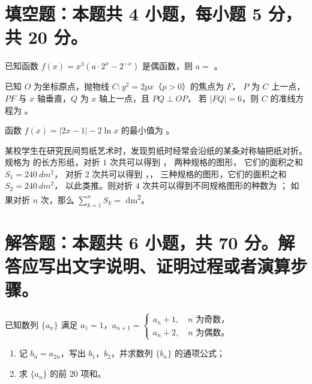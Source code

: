 \documentclass{exam-zh}
\begin{document}
\section{填空题：本题共 4 小题，每小题 5 分，共 20 分。}

\begin{question}
  已知函数 $f(x) = x^3 (a \cdot 2^x - 2^{-x})$ 是偶函数，则 $a = $ \fillin[$1$] 。
\end{question}

\begin{question}
  已知 $O$ 为坐标原点，抛物线 $C \colon y^2 = 2px$（$p > 0$）的焦点为 $F$，
  $P$ 为 $C$ 上一点，$PF$ 与 $x$ 轴垂直，$Q$ 为 $x$ 轴上一点，且 $PQ \perp OP$，
  若 $|FQ| = 6$，则 $C$ 的准线方程为 \fillin[$\dfrac{1}{3}$] 。
\end{question}

\begin{question}
  函数 $f(x) = |2x - 1| - 2 \ln x$ 的最小值为 \fillin[width = 6em][] 。
\end{question}

\begin{question}
  某校学生在研究民间剪纸艺术时，发现剪纸时经常会沿纸的某条对称轴把纸对折。
  规格为  的长方形纸，对折 $1$ 次共可以得到
  ，  两种规格的图形，
  它们的面积之和 $S_1 = \qty{240}{dm^2}$，
  对折 $2$ 次共可以得到 ，，
   三种规格的图形，它们的面积之和 $S_2 = \qty{240}{dm^2}$，
  以此类推。则对折 $4$ 次共可以得到不同规格图形的种数为 \fillin ；
  如果对折 $n$ 次，那么 $\sum_{k=1}^n S_k = $ \fillin \unit{dm^2}。
\end{question}



\section{解答题：本题共 6 小题，共 70 分。解答应写出文字说明、证明过程或者演算步骤。}

\begin{problem}[points = 10]
  已知数列 $\{a_n\}$ 满足 $a_1 = 1$，$a_{n+1} =
    \begin{cases}
      a_n + 1, \quad \text{$n$ 为奇数，} \\
      a_n + 2, \quad \text{$n$ 为偶数。}
    \end{cases}$
  \begin{enumerate}
    \item 记 $b_n = a_{2n}$，写出 $b_1$，$b_2$，并求数列 $\{b_n\}$ 的通项公式；
    \item 求 $\{a_n\}$ 的前 $20$ 项和。
  \end{enumerate}
\end{problem}
\end{document}
